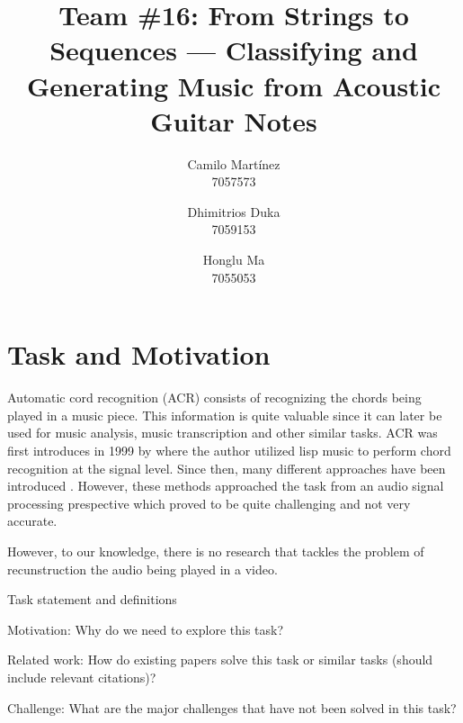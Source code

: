 \documentclass[10pt,twocolumn,letterpaper]{article}
\begin{document}
\title{Team \#16: From Strings to Sequences --- Classifying and Generating Music from Acoustic Guitar Notes}

\author{
Camilo Martínez\\
7057573\\
\and
Dhimitrios Duka\\
7059153\\
\and
Honglu Ma\\
7055053\\
}
\maketitle

\section{Task and Motivation}
Automatic cord recognition (ACR) consists of recognizing the chords being played in a music piece. This information is quite valuable since it can later be used for music analysis, music transcription and other similar tasks. ACR was first introduces in 1999 by \cite{takuya1999realtime} where the author utilized lisp music to perform chord recognition at the signal level. Since then, many different approaches have been introduced \cite{}. However, these methods approached the task from an audio signal processing prespective which proved to be quite challenging and not very accurate. 



However, to our knowledge, there is no research that tackles the problem of recunstruction the audio being played in a video. 

Task statement and definitions

Motivation: Why do we need to explore this task?

Related work: How do existing papers solve this task or similar tasks (should include relevant citations)?

Challenge: What are the major challenges that have not been solved in this task?

\cite{Kristian_Zaman_Tenoyo_Jodhinata_2024}
\cite{du2023conditional}
\end{document}
